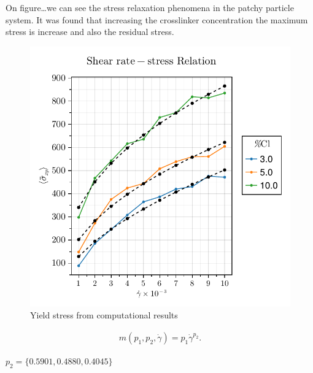 On figure\ldots we can see the stress relaxation phenomena in the patchy particle system.
It was found that increasing the crosslinker concentration the maximum stress is increase and also the residual stress.

\newpage



\begin{figure}[ht!]
    \centering
    \includegraphics[width=\textwidth]{figs/ComputaitonalResults/yieldStress.pdf}
    \caption{Yield stress from computational results}\label{fig:yieldStressResults}
\end{figure}

\begin{gather}
    m(p_1,p_2,\dot{\gamma}) = p_1\dot{\gamma}^{p_2}.
\end{gather}

$p_2 = \{0.5901,0.4880,0.4045\}$


